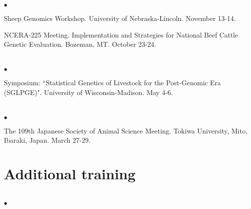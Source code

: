 \documentclass[margin,line,10pt]{res}
\newenvironment{list2}{
  \begin{list}{$\bullet$}{%
      \setlength{\itemsep}{0in}
      \setlength{\parsep}{0in} \setlength{\parskip}{0in}
      \setlength{\topsep}{0in} \setlength{\partopsep}{0in} 
      \setlength{\leftmargin}{0.2in}}}{\end{list}}
\begin{document}
\begin{resume}
\section{}
\begin{list2}

\item Sheep Genomics Workshop. University of Nebraska-Lincoln. November 13-14.  

\vspace{0.5cm}

\item NCERA-225 Meeting. Implementation and Strategies for National Beef Cattle Genetic Evaluation. Bozeman, MT. October 23-24. 

\end{list2}  




\section{}
\begin{list2}
\item Symposium: ``Statistical Genetics of Livestock for the Post-Genomic Era (SGLPGE)". University of Wisconsin-Madison. May 4-6. 
\end{list2}  

\section{}
\begin{list2}
\item  The 109th Japanese Society of Animal Science Meeting. Tokiwa University, Mito, Ibaraki, Japan. March 27-29. 

\end{list2}













\vspace{0.5cm}
\section{ \sc Additional training}
\vspace{1cm}

\section{}
\begin{list2}


\end{list2}
\end{resume}
\end{document}
